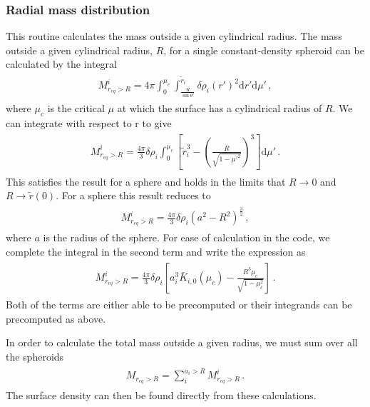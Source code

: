 \documentclass[11pt, oneside]{article}   	%
\begin{document}
\subsubsection{Radial mass distribution}
\label{HUG:sec:Mout}

This routine calculates the mass outside a given cylindrical radius. The mass outside a given cylindrical radius, $R$, for a single constant-density spheroid can be calculated by the integral
%
\begin{align}
\begin{aligned}
M_{r_{eq}>R}^i = 4 \pi \int_0^{\mu_c} \int_{\frac{R}{\sin\theta'}}^{\tilde{r}_i} \delta \rho_i \left ( r' \right )^2 \mathrm{d}r' \mathrm{d}\mu' \,,
\end{aligned}
\end{align}
%
where $\mu_c$ is the critical $\mu$ at which the surface has a cylindrical radius of $R$.
We can integrate with respect to r to give
%
\begin{align}
\begin{aligned}
M_{r_{eq}>R}^i = \frac{4 \pi}{3} \delta \rho_i  \int_0^{\mu_c} \left [ \tilde{r}_i^3 - \left (\frac{R}{\sqrt{1-\mu'^2}} \right )^3 \right ] \mathrm{d}\mu' \,.
\end{aligned}
\end{align}
%
This satisfies the result for a sphere and holds in the limits that $R \rightarrow 0$ and $R \rightarrow \tilde{r}(0)$.
For a sphere this result reduces to
%
\begin{align}
\begin{aligned}
M_{r_{eq}>R}^i = \frac{4 \pi}{3} \delta \rho_i  \left ( a^2 - R^2 \right )^{\frac{3}{2}} \,,
\end{aligned}
\end{align}
%
where $a$ is the radius of the sphere.
For ease of calculation in the code, we complete the integral in the second term and write the expression as
%
\begin{align}
\begin{aligned}
M_{r_{eq}>R}^i = \frac{4 \pi}{3} \delta \rho_i  \left [ a_i^3 \bar{K}_{i,0}(\mu_c)- \frac{R^3 \mu_c}{\sqrt{1-\mu_c^2}} \right ] \,.
\end{aligned}
\end{align}
%
Both of the terms are either able to be precomputed or their integrands can be precomputed as above.

In order to calculate the total mass outside a given radius, we must sum over all the spheroids
%
\begin{align}
\begin{aligned}
M_{r_{eq}>R} = \sum_{i}^{a_i>R} M_{r_{eq}>R}^i \,.
\end{aligned}
\end{align}
%
The surface density can then be found directly from these calculations.
\end{document}
